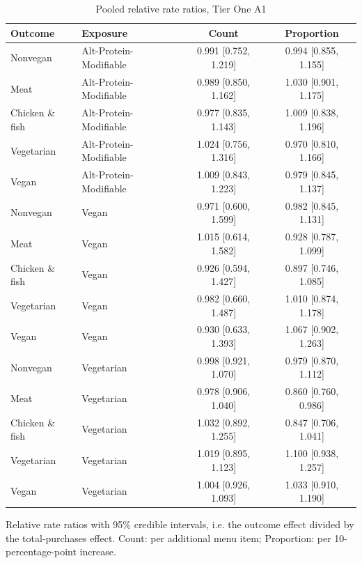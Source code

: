 

\begin{table}[H]
\centering
\caption{Pooled relative rate ratios, Tier One A1}
\label{tab:rr_t1_a1}
\begin{tabular}{llcc}
\toprule
Outcome & Exposure & Count & Proportion \\
\midrule
Nonvegan & Alt-Protein-Modifiable & 0.991 [0.752, 1.219] & 0.994 [0.855, 1.155] \\
Meat & Alt-Protein-Modifiable & 0.989 [0.850, 1.162] & 1.030 [0.901, 1.175] \\
Chicken \& fish & Alt-Protein-Modifiable & 0.977 [0.835, 1.143] & 1.009 [0.838, 1.196] \\
Vegetarian & Alt-Protein-Modifiable & 1.024 [0.756, 1.316] & 0.970 [0.810, 1.166] \\
Vegan & Alt-Protein-Modifiable & 1.009 [0.843, 1.223] & 0.979 [0.845, 1.137] \\
Nonvegan & Vegan & 0.971 [0.600, 1.599] & 0.982 [0.845, 1.131] \\
Meat & Vegan & 1.015 [0.614, 1.582] & 0.928 [0.787, 1.099] \\
Chicken \& fish & Vegan & 0.926 [0.594, 1.427] & 0.897 [0.746, 1.085] \\
Vegetarian & Vegan & 0.982 [0.660, 1.487] & 1.010 [0.874, 1.178] \\
Vegan & Vegan & 0.930 [0.633, 1.393] & 1.067 [0.902, 1.263] \\
Nonvegan & Vegetarian & 0.998 [0.921, 1.070] & 0.979 [0.870, 1.112] \\
Meat & Vegetarian & 0.978 [0.906, 1.040] & 0.860 [0.760, 0.986] \\
Chicken \& fish & Vegetarian & 1.032 [0.892, 1.255] & 0.847 [0.706, 1.041] \\
Vegetarian & Vegetarian & 1.019 [0.895, 1.123] & 1.100 [0.938, 1.257] \\
Vegan & Vegetarian & 1.004 [0.926, 1.093] & 1.033 [0.910, 1.190] \\
\bottomrule
\end{tabular}
\par\smallskip\footnotesize Relative rate ratios with 95\% credible intervals, i.e. the outcome effect divided by the total-purchases effect. Count: per additional menu item; Proportion: per 10-percentage-point increase.
\end{table}

